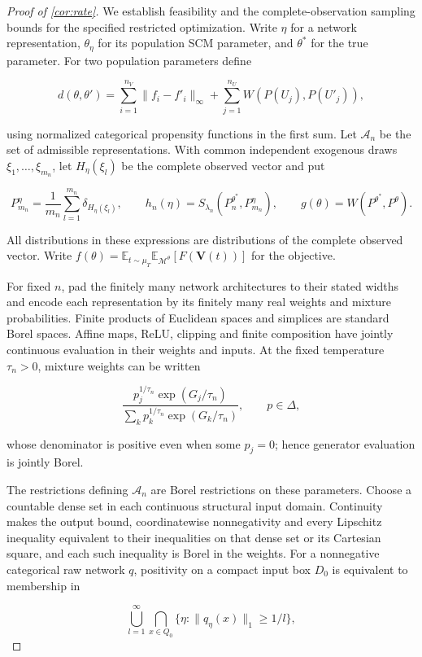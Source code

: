 \begin{proof}[Proof of \cref{cor:rate}]
We establish feasibility and the complete-observation sampling bounds for the specified restricted optimization. Write $\eta$ for a network representation, $\theta_\eta$ for its population SCM parameter, and $\theta^*$ for the true parameter. For two population parameters define

\[
d(\theta,\theta')=\sum_{i=1}^{n_V}\|f_i-f'_i\|_\infty+\sum_{j=1}^{n_U}W(P(U_j),P(U'_j)),
\]

using normalized categorical propensity functions in the first sum. Let $\mathcal A_n$ be the set of admissible representations. With common independent exogenous draws $\xi_1,\ldots,\xi_{m_n}$, let $H_\eta(\xi_l)$ be the complete observed vector and put

\[
P_{m_n}^\eta=\frac1{m_n}\sum_{l=1}^{m_n}\delta_{H_\eta(\xi_l)},\qquad h_n(\eta)=S_{\lambda_n}(P_n^{\theta^*},P_{m_n}^\eta),\qquad g(\theta)=W(P^{\theta^*},P^\theta).
\]

All distributions in these expressions are distributions of the complete observed vector. Write $f(\theta)=\mathbb E_{t\sim\mu_T}\mathbb E_{\mathcal M^\theta}[F(\boldsymbol V(t))]$ for the objective. 

For fixed $n$, pad the finitely many network architectures to their stated widths and encode each representation by its finitely many real weights and mixture probabilities. Finite products of Euclidean spaces and simplices are standard Borel spaces. Affine maps, ReLU, clipping and finite composition have jointly continuous evaluation in their weights and inputs. At the fixed temperature $\tau_n>0$, mixture weights can be written

\[
\frac{p_j^{1/\tau_n}\exp(G_j/\tau_n)}{\sum_k p_k^{1/\tau_n}\exp(G_k/\tau_n)},\qquad p\in\Delta,
\]

whose denominator is positive even when some $p_j=0$; hence generator evaluation is jointly Borel. 

The restrictions defining $\mathcal A_n$ are Borel restrictions on these parameters. Choose a countable dense set in each continuous structural input domain. Continuity makes the output bound, coordinatewise nonnegativity and every Lipschitz inequality equivalent to their inequalities on that dense set or its Cartesian square, and each such inequality is Borel in the weights. For a nonnegative categorical raw network $q$, positivity on a compact input box $D_0$ is equivalent to membership in

\[
\bigcup_{l=1}^\infty\bigcap_{x\in Q_0}\{\eta:\|q_\eta(x)\|_1\geqslant1/l\},
\]


\end{proof}
